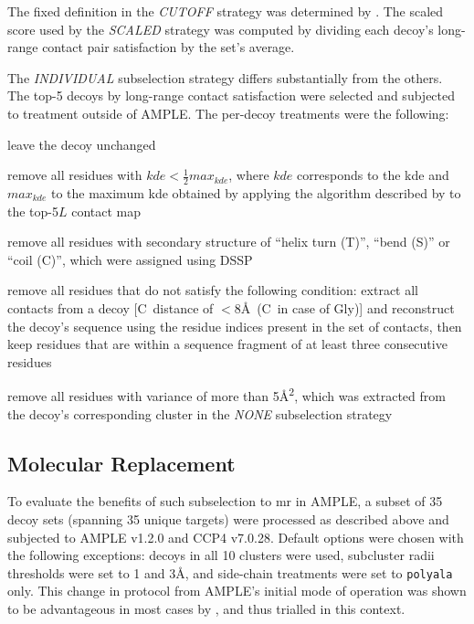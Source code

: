 The fixed definition in the \textit{CUTOFF} strategy was determined by \textcite{De_Oliveira2017-gj}. The scaled score used by the \textit{SCALED} strategy was computed by dividing each decoy's long-range contact pair satisfaction by the set's average.

The \textit{INDIVIDUAL} subselection strategy differs substantially from the others. The top-5 decoys by long-range contact satisfaction were selected and subjected to treatment outside of AMPLE. The per-decoy treatments were the following:

\begin{description}[style=multiline,leftmargin=4cm]
    \item[default] leave the decoy unchanged
    \item[domain] remove all residues with $kde<\frac{1}{2}max_{kde}$, where $kde$ corresponds to the \gls{kde} and $max_{kde}$ to the maximum \gls{kde} obtained by applying the algorithm described by \textcite{Sadowski2013-zu} to the top-5$L$ contact map
    \item[dssp] remove all residues with secondary structure of ``helix turn (T)'', ``bend (S)'' or ``coil (C)'', which were assigned using DSSP \cite{Frishman1995-si} 
    \item[fragment] remove all residues that do not satisfy the following condition: extract all contacts from a decoy [C\textbeta\ distance of $<8$\AA\ (C\textalpha\ in case of Gly)] and reconstruct the decoy's sequence using the residue indices present in the set of contacts, then keep residues that are within a sequence fragment of at least three consecutive residues
    \item[variance] remove all residues with variance of more than 5\AA\textsuperscript{2}, which was extracted from the decoy's corresponding cluster in the \textit{NONE} subselection strategy
\end{description}

\subsection{Molecular Replacement} \label{subsec:ample_decoys_methods_mr}
To evaluate the benefits of such subselection to \gls{mr} in AMPLE, a subset of 35 decoy sets (spanning 35 unique targets) were processed as described above and subjected to AMPLE v1.2.0 and CCP4 v7.0.28. Default options were chosen with the following exceptions: decoys in all 10 clusters were used, subcluster radii thresholds were set to 1 and 3\AA, and side-chain treatments were set to \texttt{polyala} only. This change in protocol from AMPLE's initial mode of operation \cite{Bibby2012-lm} was shown to be advantageous in most cases by \textcite{Thomas2017-qu}, and thus trialled in this context. 

